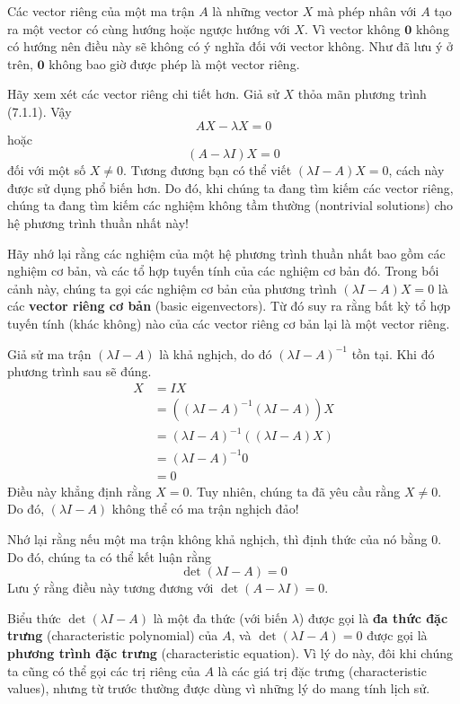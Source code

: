 Các vector riêng của một ma trận $A$ là những vector $X$ mà phép nhân với $A$ tạo ra một vector có cùng hướng hoặc ngược hướng với $X$. Vì vector không $\mathbf{0}$ không có hướng nên điều này sẽ không có ý nghĩa đối với vector không. Như đã lưu ý ở trên, $\mathbf{0}$ không bao giờ được phép là một vector riêng.

Hãy xem xét các vector riêng chi tiết hơn. Giả sử $X$ thỏa mãn phương trình (7.1.1). Vậy
\begin{equation*}
AX-\lambda X=0
\end{equation*}
hoặc
\begin{equation*}
(A-\lambda I)X=0
\end{equation*}
đối với một số $X\ne0$. Tương đương bạn có thể viết $(\lambda I-A)X=0$, cách này được sử dụng phổ biến hơn. Do đó, khi chúng ta đang tìm kiếm các vector riêng, chúng ta đang tìm kiếm các nghiệm không tầm thường (nontrivial solutions) cho hệ phương trình thuần nhất này!

Hãy nhớ lại rằng các nghiệm của một hệ phương trình thuần nhất bao gồm các nghiệm cơ bản, và các tổ hợp tuyến tính của các nghiệm cơ bản đó. Trong bối cảnh này, chúng ta gọi các nghiệm cơ bản của phương trình $(\lambda I-A)X=0$ là các \textbf{vector riêng cơ bản} (basic eigenvectors). Từ đó suy ra rằng bất kỳ tổ hợp tuyến tính (khác không) nào của các vector riêng cơ bản lại là một vector riêng.

Giả sử ma trận $(\lambda I-A)$ là khả nghịch, do đó $(\lambda I-A)^{-1}$ tồn tại. Khi đó phương trình sau sẽ đúng.
\begin{align*}
X &= IX \\
&= ((\lambda I-A)^{-1}(\lambda I-A))X \\
&= (\lambda I-A)^{-1}((\lambda I-A)X) \\
&= (\lambda I-A)^{-1}0 \\
&= 0
\end{align*}
Điều này khẳng định rằng $X=0$. Tuy nhiên, chúng ta đã yêu cầu rằng $X\ne0$. Do đó, $(\lambda I-A)$ không thể có ma trận nghịch đảo!

Nhớ lại rằng nếu một ma trận không khả nghịch, thì định thức của nó bằng 0. Do đó, chúng ta có thể kết luận rằng
\begin{equation}
\det(\lambda I-A)=0
\end{equation}
Lưu ý rằng điều này tương đương với $\det(A-\lambda I)=0$.

Biểu thức $\det(\lambda I-A)$ là một đa thức (với biến $\lambda$) được gọi là \textbf{đa thức đặc trưng} (characteristic polynomial) của $A$, và $\det(\lambda I-A)=0$ được gọi là \textbf{phương trình đặc trưng} (characteristic equation). Vì lý do này, đôi khi chúng ta cũng có thể gọi các trị riêng của $A$ là các giá trị đặc trưng (characteristic values), nhưng từ trước thường được dùng vì những lý do mang tính lịch sử.

